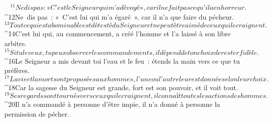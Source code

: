            
${}^{11}Ne dis pas : « C’est le Seigneur qui m’a dévoyé »,
        car il ne fait pas ce qu’il a en horreur.
${}^{12}Ne dis pas : « C’est lui qui m’a égaré »,
        car il n’a que faire du pécheur.
${}^{13}Tout ce qui est abominable est détesté du Seigneur
        et ne peut être aimé de ceux qui le craignent.
${}^{14}C’est lui qui, au commencement, a créé l’homme
        et l’a laissé à son libre arbitre.
        ${}^{15}Si tu le veux, tu peux observer les commandements,
        il dépend de ton choix de rester fidèle.
        ${}^{16}Le Seigneur a mis devant toi l’eau et le feu :
        étends la main vers ce que tu préfères.
        ${}^{17}La vie et la mort sont proposées aux hommes,
        l’une ou l’autre leur est donnée selon leur choix.
        ${}^{18}Car la sagesse du Seigneur est grande,
        fort est son pouvoir, et il voit tout.
        ${}^{19}Ses regards sont tournés vers ceux qui le craignent,
        il connaît toutes les actions des hommes.
        ${}^{20}Il n’a commandé à personne d’être impie,
        il n’a donné à personne la permission de pécher.
      
